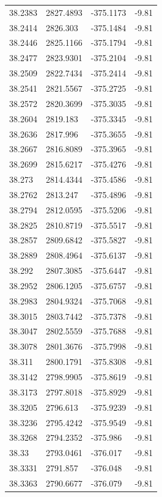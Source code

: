 \begin{table}[H]
\begin{tabular}{llll}
38.2383 & 2827.4893 & -375.1173 & -9.81 \\
38.2414 & 2826.303 & -375.1484 & -9.81 \\
38.2446 & 2825.1166 & -375.1794 & -9.81 \\
38.2477 & 2823.9301 & -375.2104 & -9.81 \\
38.2509 & 2822.7434 & -375.2414 & -9.81 \\
38.2541 & 2821.5567 & -375.2725 & -9.81 \\
38.2572 & 2820.3699 & -375.3035 & -9.81 \\
38.2604 & 2819.183 & -375.3345 & -9.81 \\
38.2636 & 2817.996 & -375.3655 & -9.81 \\
38.2667 & 2816.8089 & -375.3965 & -9.81 \\
38.2699 & 2815.6217 & -375.4276 & -9.81 \\
38.273 & 2814.4344 & -375.4586 & -9.81 \\
38.2762 & 2813.247 & -375.4896 & -9.81 \\
38.2794 & 2812.0595 & -375.5206 & -9.81 \\
38.2825 & 2810.8719 & -375.5517 & -9.81 \\
38.2857 & 2809.6842 & -375.5827 & -9.81 \\
38.2889 & 2808.4964 & -375.6137 & -9.81 \\
38.292 & 2807.3085 & -375.6447 & -9.81 \\
38.2952 & 2806.1205 & -375.6757 & -9.81 \\
38.2983 & 2804.9324 & -375.7068 & -9.81 \\
38.3015 & 2803.7442 & -375.7378 & -9.81 \\
38.3047 & 2802.5559 & -375.7688 & -9.81 \\
38.3078 & 2801.3676 & -375.7998 & -9.81 \\
38.311 & 2800.1791 & -375.8308 & -9.81 \\
38.3142 & 2798.9905 & -375.8619 & -9.81 \\
38.3173 & 2797.8018 & -375.8929 & -9.81 \\
38.3205 & 2796.613 & -375.9239 & -9.81 \\
38.3236 & 2795.4242 & -375.9549 & -9.81 \\
38.3268 & 2794.2352 & -375.986 & -9.81 \\
38.33 & 2793.0461 & -376.017 & -9.81 \\
38.3331 & 2791.857 & -376.048 & -9.81 \\
38.3363 & 2790.6677 & -376.079 & -9.81 \\

\end{tabular}
\end{table}
